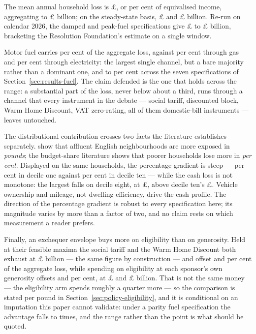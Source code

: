 The mean annual household loss is \pounds \genCentralLossMean{}, or \genCentralLossPctIncome{} per cent of equivalised income, aggregating to \pounds \genAggSpendRealisedBn{} billion; on the steady-state basis, \pounds \genSteadyStateLossMean{} and \pounds \genSteadyStateAggBn{} billion. Re-run on calendar 2026, the damped and peak-fuel specifications give \pounds \genCalendarAggBn{} to \pounds \genPeakFuelCalendarAggBn{} billion, bracketing the Resolution Foundation's estimate on a single window.

Motor fuel carries \genMotorFuelShareOfLoss{} per cent of the aggregate loss, against \genGasShareOfLoss{} per cent through gas and \genElecShareOfLoss{} per cent through electricity: the largest single channel, but a bare majority rather than a dominant one, and \genSpecFuelShareMinPct{} to \genSpecFuelShareMaxPct{} per cent across the seven specifications of Section~\ref{sec:results-fuel}. The claim defended is the one that holds across the range: a substantial part of the loss, never below about a third, runs through a channel that every instrument in the debate --- social tariff, discounted block, Warm Home Discount, VAT zero-rating, all of them domestic-bill instruments --- leaves untouched.

The distributional contribution crosses two facts the literature establishes separately. \citet{fetzer2024} show that affluent English neighbourhoods are more exposed in \emph{pounds}; the budget-share literature shows that poorer households lose more in \emph{per cent}. Displayed on the same households, the percentage gradient is steep --- \genDecileOneLossPct{} per cent in decile one against \genDecileTenLossPct{} per cent in decile ten --- while the cash loss is not monotone: the largest falls on decile eight, at \pounds \genDecileEightLossGbp{}, above decile ten's \pounds \genDecileTenLossGbp{}. Vehicle ownership and mileage, not dwelling efficiency, drive the cash profile. The direction of the percentage gradient is robust to every specification here; its magnitude varies by more than a factor of two, and no claim rests on which measurement a reader prefers.

Finally, an exchequer envelope buys more on eligibility than on generosity. Held at their feasible maxima the social tariff and the Warm Home Discount both exhaust at \pounds \genSocialTariffFeasibleMaxCostBn{} billion --- the same figure by construction --- and offset \genSocialTariffEnvelopeOffsetPct{} and \genWhdEnvelopeOffsetPct{} per cent of the aggregate loss, while spending on eligibility at each sponsor's own generosity offsets \genSocialTariffEligibilityOffsetPct{} and \genWhdEligibilityOffsetPct{} per cent, at \pounds \genSocialTariffEligibilityCostBn{} and \pounds \genWhdEligibilityCostBn{} billion. That is not the same money --- the eligibility arm spends roughly a quarter more --- so the comparison is stated per pound in Section~\ref{sec:policy-eligibility}, and it is conditional on an imputation this paper cannot validate: under a parity fuel specification the advantage falls to \genTargetingMultipleUnderParity{} times, and the range rather than the point is what should be quoted.

